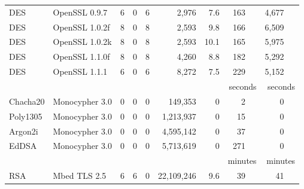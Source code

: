 \begin{table}[h]
{\begin{tabular}{llrrrrrrr}
        DES                & OpenSSL 0.9.7            & 6                      & 0                   & 6                    & 2,976       & 7.6  & 163 ~~    & 4,677       ~~  \\
        DES                & OpenSSL 1.0.2f           & 8                      & 0                   & 8                    & 2,593       & 9.8  & 166 ~~    & 6,509       ~~  \\
        DES                & OpenSSL 1.0.2k           & 8                      & 0                   & 8                    & 2,593       & 10.1 & 165 ~~    & 5,975        ~~ \\
        DES                & OpenSSL 1.1.0f           & 8                      & 0                   & 8                    & 4,260       & 8.8  & 182 ~~    & 5,292        ~~ \\
        DES                & OpenSSL 1.1.1            & 6                      & 0                   & 6                    & 8,272       & 7.5  & 229 ~~    & 5,152       ~~  \\
                           &                          &                        &                     &                      &             &      & seconds   & seconds               \\\cline{8-9}
        Chacha20           & Monocypher 3.0           & 0                      & 0                   & 0                    & 149,353     & 0    & 2 ~~    & 0           ~~  \\  
        Poly1305           & Monocypher 3.0           & 0                      & 0                   & 0                    & 1,213,937   & 0    & 15 ~~   & 0           ~~  \\
        Argon2i            & Monocypher 3.0           & 0                      & 0                   & 0                    & 4,595,142   & 0    & 37 ~~   & 0           ~~  \\
        EdDSA              & Monocypher 3.0           & 0                      & 0                   & 0                    & 5,713,619   & 0    & 271 ~~  & 0           ~~  \\
                           &                          &                        &                     &                      &             &      & minutes   & minutes         \\\cline{8-9}
        RSA                & Mbed TLS 2.5             & 6                      & 6                   & 0                    & 22,109,246  & 9.6  & 39 ~~     & 41  ~~          \\

\end{tabular}}
\end{table}
